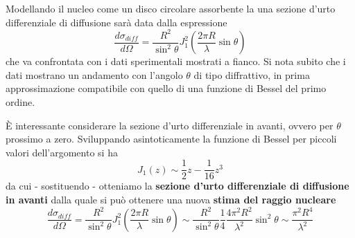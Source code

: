 Modellando il nucleo come un disco circolare assorbente la una sezione d'urto differenziale di diffusione sarà data dalla espressione \[
	\frac{d\sigma_{diff}}{d \Omega} = \frac{R^{2}}{\sin ^{2}\theta}J_{1}^{2}\left( \frac{2 \pi R}{\lambda} \sin \theta \right)
\] che va confrontata con i dati sperimentali mostrati a fianco.
Si nota subito che i dati mostrano un andamento con l'angolo $\theta$ di tipo diffrattivo, in prima approssimazione compatibile con quello di una funzione di Bessel del primo ordine.

È interessante considerare la sezione d'urto differenziale in avanti, ovvero per $\theta$ prossimo a zero.
Sviluppando asintoticamente la funzione di Bessel per piccoli valori dell'argomento si ha \[
	J_{1}(z) \sim \frac{1}{2}z - \frac{1}{16}z^{3}
\] da cui - sostituendo - otteniamo la \textbf{sezione d'urto differenziale di diffusione in avanti} dalla quale si può ottenere una nuova \textbf{stima del raggio nucleare}
\[
	\frac{d\sigma_{diff}}{d \Omega} = \frac{R^{2}}{\sin ^{2}\theta}J_{1}^{2}\left( \frac{2 \pi R}{\lambda} \sin \theta \right) \sim \frac{R^{2}}{\sin ^{2}\theta} \frac{1}{4} \frac{4 \pi^{2} R^{2}}{\lambda^{2}} \sin ^{2} \theta \sim \frac{\pi^{2}R^{4}}{\lambda^{2}}
\]
